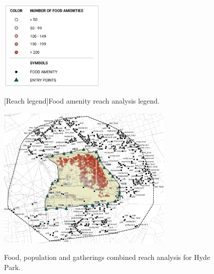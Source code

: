 \begin{multicols}{2}
\begin{figure}[H]
  \centering
  \includegraphics[width=0.45\textwidth]{images/network/reach_legend.png}\par{}[Reach legend]{Food amenity reach analysis legend.}
  \label{fig:reach_legend}
\end{figure} 

\end{multicols}

\begin{figure}[H]
  \centering
  \captionsetup{width=0.9\textwidth}
  \includegraphics[width=0.75\textwidth]{images/network/hyde_gath_food_pop.png} \\
  \caption[Hyde Park - reach]{Food, population and gatherings combined reach analysis for Hyde Park.}
  \label{fig:hyde_reach}
\end{figure}

